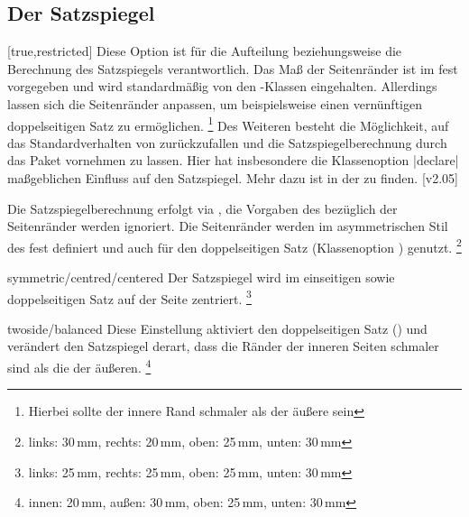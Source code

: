 \begin{Declaration*}{}
\begin{Declaration*}{}
\begin{Declaration*}{}
\subsection{Der Satzspiegel}
%
%
\begin{Declaration}[%
  v2.03;
  v2.05!\Option{cdgeometry=restricted};%
  v2.05!\Option{cdgeometry=adapted};%
  v2.05!\Option{cdgeometry=calculated};%
]{}[true,restricted]%
\printdeclarationlist%
%
%
%
Diese Option ist für die Aufteilung beziehungsweise die Berechnung des 
Satzspiegels verantwortlich. Das Maß der Seitenränder ist im \CD fest 
vorgegeben und wird standardmäßig von den \TUDScript-Klassen eingehalten. 
Allerdings lassen sich die Seitenränder anpassen, um beispielsweise einen 
vernünftigen doppelseitigen Satz zu ermöglichen.%
\footnote{Hierbei sollte der innere Rand schmaler als der äußere sein}
Des Weiteren besteht die Möglichkeit, auf das Standardverhalten von 
\KOMAScript{} zurückzufallen und die Satzspiegelberechnung durch das Paket
 vornehmen zu lassen. Hier hat insbesondere die Klassenoption 
|declare| maßgeblichen Einfluss auf den Satzspiegel. Mehr 
dazu ist in der  zu finden.
[v2.05]
%
\begin{values}{}
\itemfalse
  Die Satzspiegelberechnung erfolgt via , die Vorgaben des 
  \CDs bezüglich der Seitenränder werden ignoriert.
\itemtrue*[asymmetric/cd]
  Die Seitenränder werden im asymmetrischen Stil des \CDs fest definiert und 
  auch für den doppelseitigen Satz (Klassenoption ) 
  genutzt.%
  \footnote{links: 30\,mm, rechts: 20\,mm, oben: 25\,mm, unten: 30\,mm}
\item[symmetric/centred/centered]
  Der Satzspiegel wird im einseitigen sowie doppelseitigen Satz auf der Seite 
  zentriert.%
  \footnote{links: 25\,mm, rechts: 25\,mm, oben: 25\,mm, unten: 30\,mm}
\item[twoside/balanced]
  Diese Einstellung aktiviert den doppelseitigen Satz () 
  und verändert den Satzspiegel derart, dass die Ränder der inneren Seiten 
  schmaler sind als die der äußeren.%
  \footnote{innen: 20\,mm, außen: 30\,mm, oben: 25\,mm, unten: 30\,mm}
\end{values}
\end{Declaration}
\end{Declaration*}
\end{Declaration*}
\end{Declaration*}
